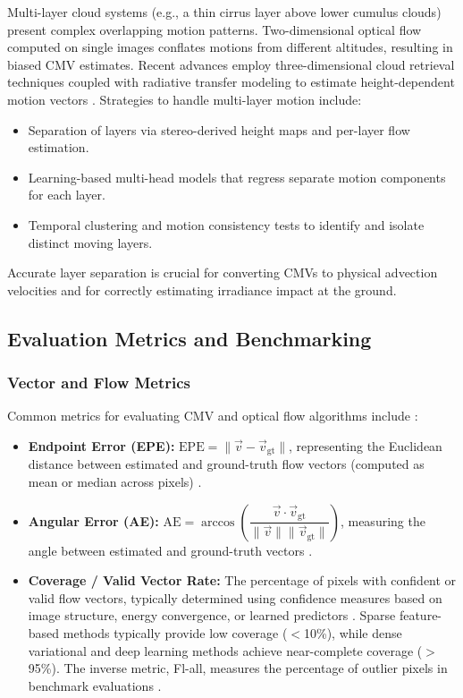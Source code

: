 Multi-layer cloud systems (e.g., a thin cirrus layer above lower cumulus clouds) present complex overlapping motion patterns. Two-dimensional optical flow computed on single images conflates motions from different altitudes, resulting in biased CMV estimates. Recent advances employ three-dimensional cloud retrieval techniques coupled with radiative transfer modeling to estimate height-dependent motion vectors \cite{kosmopoulos2024}. Strategies to handle multi-layer motion include:
\begin{itemize}
  \item Separation of layers via stereo-derived height maps and per-layer flow estimation.
  \item Learning-based multi-head models that regress separate motion components for each layer.
  \item Temporal clustering and motion consistency tests to identify and isolate distinct moving layers.
\end{itemize}

Accurate layer separation is crucial for converting CMVs to physical advection velocities and for correctly estimating irradiance impact at the ground.

\subsection{Evaluation Metrics and Benchmarking}
\label{sec:benchmark}

\subsubsection{Vector and Flow Metrics}
Common metrics for evaluating CMV and optical flow algorithms include \cite{baker2011,barron1994}:
\begin{itemize}
  \item \textbf{Endpoint Error (EPE):} $\mathrm{EPE} = \|\vec{v} - \vec{v}_{\mathrm{gt}}\|$, representing the Euclidean distance between estimated and ground-truth flow vectors (computed as mean or median across pixels) \cite{baker2011}.
  \item \textbf{Angular Error (AE):} $\mathrm{AE} = \arccos\left(\dfrac{\vec{v}\cdot\vec{v}_{\mathrm{gt}}}{\|\vec{v}\|\|\vec{v}_{\mathrm{gt}}\|}\right)$, measuring the angle between estimated and ground-truth vectors \cite{barron1994,baker2011}.
  \item \textbf{Coverage / Valid Vector Rate:} The percentage of pixels with confident or valid flow vectors, typically determined using confidence measures based on image structure, energy convergence, or learned predictors \cite{kondermann2008,macaodha2013}. Sparse feature-based methods typically provide low coverage ($<$10\%), while dense variational and deep learning methods achieve near-complete coverage ($>$95\%). The inverse metric, Fl-all, measures the percentage of outlier pixels in benchmark evaluations \cite{menze2015,baker2011}.
\end{itemize}

